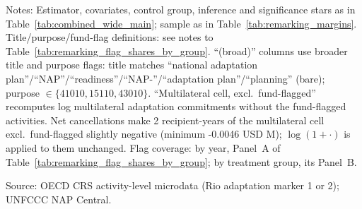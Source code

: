\begin{table}[H]
\centering
\caption{Re-estimating the main-specification effect excluding NAP-support, readiness, and climate-fund activity}
\label{tab:remarking_exclusions}
\begingroup\small
{}
\endgroup
\par\vspace{4pt}
\begin{minipage}{\linewidth}\footnotesize
Notes: Estimator, covariates, control group, inference and significance stars as in Table~\ref{tab:combined_wide_main}; sample as in Table~\ref{tab:remarking_margins}. Title/purpose/fund-flag definitions: see notes to Table~\ref{tab:remarking_flag_shares_by_group}. ``(broad)'' columns use broader title and purpose flags: title matches ``national adaptation plan''/``NAP''/``readiness''/``NAP-''/``adaptation plan''/``planning'' (bare); purpose $\in\{41010,15110,43010\}$. ``Multilateral cell, excl.\ fund-flagged'' recomputes log multilateral adaptation commitments without the fund-flagged activities. Net cancellations make 2 recipient-years of the multilateral cell excl.\ fund-flagged slightly negative (minimum -0.0046 USD M); $\log(1+\cdot)$ is applied to them unchanged. Flag coverage: by year, Panel~A of Table~\ref{tab:remarking_flag_shares_by_group}; by treatment group, its Panel~B.\par
Source: OECD CRS activity-level microdata (Rio adaptation marker 1 or 2); UNFCCC NAP Central.
\end{minipage}
\end{table}

